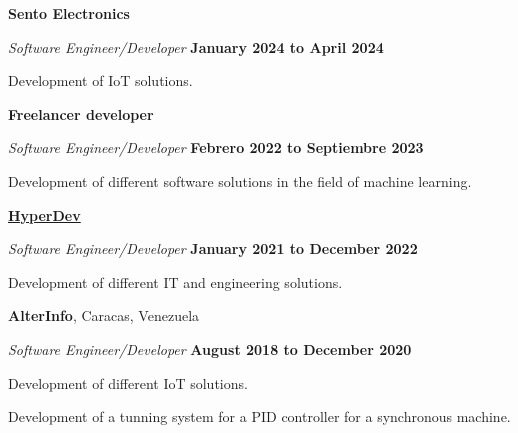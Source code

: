 \documentclass[10pt]{article}
\begin{document}
\textbf{Sento Electronics}
\begin{outerlist}
    \item[] \textit{Software Engineer/Developer}
            \hfill \textbf{January 2024 to April 2024}
            \begin{innerlist}
                \item Development of IoT solutions.
            \end{innerlist}
\end{outerlist}

\textbf{Freelancer developer}
\begin{outerlist}
    \item[] \textit{Software Engineer/Developer}
            \hfill \textbf{Febrero 2022 to Septiembre 2023}
            \begin{innerlist}
                \item Development of different software solutions in the field of machine learning.
            \end{innerlist}
\end{outerlist}

\href{https://hypedev.design/}{\textbf{HyperDev}}
\begin{outerlist}
    \item[] \textit{Software Engineer/Developer}
            \hfill \textbf{January 2021 to December 2022}
            \begin{innerlist}
                \item Development of different IT and engineering solutions.
            \end{innerlist}

\end{outerlist}

\textbf{AlterInfo}, Caracas, Venezuela
\begin{outerlist}
    \item[] \textit{Software Engineer/Developer}%
            \hfill \textbf{August 2018 to December 2020}
            \begin{innerlist}
                \item Development of different IoT solutions.
                \item Development of a tunning system for a PID controller for a synchronous machine.
            \end{innerlist}
\end{outerlist}
\end{document}
